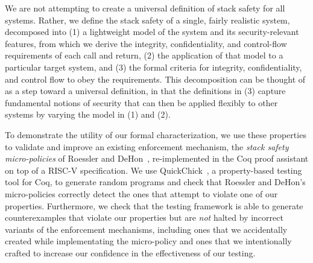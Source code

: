 We are not attempting to create a universal definition of stack safety for all systems.
Rather, we define the stack safety of a single, fairly realistic system, decomposed into
(1) a lightweight model of the system and its security-relevant features, from which we
derive the integrity, confidentiality, and control-flow requirements of each call and
return, (2) the application of that model to a particular target system, and (3)
the formal criteria for integrity, confidentiality, and control flow
to obey the requirements. This decomposition can be thought of as a step toward
a universal definition, in that the definitions in (3) capture fundamental
notions of security that can then be applied flexibly to other systems by varying
the model in (1) and (2).
%


To demonstrate the utility of our formal characterization, we use these
properties to validate and improve an existing enforcement mechanism, the
{\em stack safety micro-policies} of Roessler and DeHon~\cite{DBLP:conf/sp/RoesslerD18}, re-implemented
in the Coq proof assistant on top of a  RISC-V specification.  We
use QuickChick~\cite{Denes:VSL2014,Pierce:SF4}, a property-based testing
tool for Coq, to generate random programs and check
that Roessler and DeHon's micro-policies correctly detect the ones that
attempt to violate one of our properties. Furthermore, we
check that the testing framework is able to generate counterexamples
that violate our properties but are \emph{not} halted by incorrect
variants of the enforcement mechanisms, including ones that we accidentally created
while implementating the micro-policy and ones that we
intentionally crafted to increase our confidence in the effectiveness
of our testing.
%

